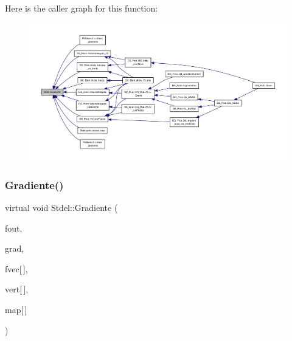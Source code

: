 Here is the caller graph for this function\+:
\nopagebreak
\begin{figure}[H]
\begin{center}
\leavevmode
\includegraphics[width=350pt]{classStdel_af3e65d1ad0d59ded925a3f5a9d0fb100_icgraph}
\end{center}
\end{figure}
\mbox{\label{classStdel_abf44e457d99e8c559c14cb1f7423da12}} 
\subsubsection{\texorpdfstring{Gradiente()}{Gradiente()}\hspace{0.1cm}{\footnotesize\ttfamily [2/3]}}
{\footnotesize\ttfamily virtual void Stdel\+::\+Gradiente (\begin{DoxyParamCaption}\item[{F\+I\+LE $\ast$}]{fout,  }\item[{double $\ast$$\ast$}]{grad,  }\item[{const double}]{fvec\mbox{[}$\,$\mbox{]},  }\item[{const \hyperlink{structVertice}{Vertice}}]{vert\mbox{[}$\,$\mbox{]},  }\item[{const int}]{map\mbox{[}$\,$\mbox{]} }\end{DoxyParamCaption})\hspace{0.3cm}{\ttfamily [pure virtual]}}

\mbox{\label{classStdel_aec200dfb0b00bebf70a1d845675eeafd}} 
